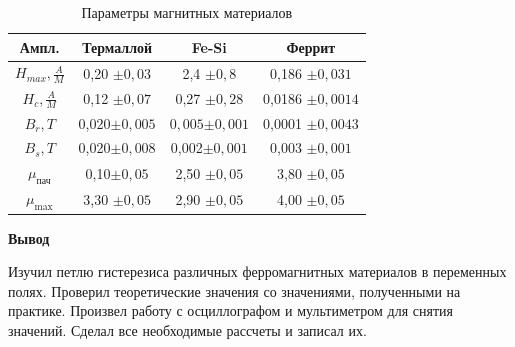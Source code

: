 \documentclass[a4paper]{article}
\begin{document}
\begin{table}[h]
\centering
\begin{tabular}{|c|c|c|c|}
\hline
Ампл. & Термаллой & Fe-Si & Феррит \\
\hline
\( H_{max}, \frac{A}{M} \) & 0,20 $\pm 0,03$ & 2,4 $\pm 0,8$ & 0,186 $\pm 0,031$\\
\hline
\( H_{c}, \frac{A}{M} \) &0,12 $\pm 0,07$  &0,27 $\pm 0,28$ &0,0186 $\pm 0,0014$ \\
\hline
\( B_r, T \) &0,020$\pm 0,005$ & $0,005 $$\pm 0,001$  &0,0001 $\pm 0,0043$ \\
\hline
\( B_s, T \) &0,020$\pm 0,008$ &0,002$\pm 0,001$  &0,003 $\pm 0,001$ \\
\hline
\( \mu_{\text{пач}} \) &0,10$\pm 0,05$ &2,50 $\pm 0,05$ &3,80 $\pm 0,05$\\
\hline
\( \mu_{\text{max}} \) &3,30 $\pm 0,05$ &2,90 $\pm 0,05$ & 4,00 $\pm 0,05$\\
\hline
\end{tabular}
\caption{Параметры магнитных материалов}
\label{tab:magnetic_params}
\end{table}


\textbf{Вывод} \par

Изучил петлю гистерезиса различных ферромагнитных материалов в переменных полях. Проверил теоретические значения со значениями,
полученными на практике. Произвел работу с осциллографом и мультиметром для снятия значений. Сделал все необходимые рассчеты и записал их.
\end{document}
